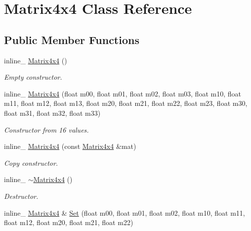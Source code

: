 \hypertarget{class_matrix4x4}{\section{Matrix4x4 Class Reference}
\label{class_matrix4x4}
}
\subsection*{Public Member Functions}
\begin{DoxyCompactItemize}
\item 
\hypertarget{class_matrix4x4_af12c3d04822f0fb2ee4e31f21117a889}{inline\+\_\+ \hyperlink{class_matrix4x4_af12c3d04822f0fb2ee4e31f21117a889}{Matrix4x4} ()}\label{class_matrix4x4_af12c3d04822f0fb2ee4e31f21117a889}

\begin{DoxyCompactList}\small\item\em Empty constructor. \end{DoxyCompactList}\item 
\hypertarget{class_matrix4x4_a99cc95e0b21467d1b25558aacfac7f1b}{inline\+\_\+ \hyperlink{class_matrix4x4_a99cc95e0b21467d1b25558aacfac7f1b}{Matrix4x4} (float m00, float m01, float m02, float m03, float m10, float m11, float m12, float m13, float m20, float m21, float m22, float m23, float m30, float m31, float m32, float m33)}\label{class_matrix4x4_a99cc95e0b21467d1b25558aacfac7f1b}

\begin{DoxyCompactList}\small\item\em Constructor from 16 values. \end{DoxyCompactList}\item 
\hypertarget{class_matrix4x4_a0d1bf6d849f305966d9cd641167372b1}{inline\+\_\+ \hyperlink{class_matrix4x4_a0d1bf6d849f305966d9cd641167372b1}{Matrix4x4} (const \hyperlink{class_matrix4x4}{Matrix4x4} \&mat)}\label{class_matrix4x4_a0d1bf6d849f305966d9cd641167372b1}

\begin{DoxyCompactList}\small\item\em Copy constructor. \end{DoxyCompactList}\item 
\hypertarget{class_matrix4x4_a6f86a878ccf07228c7ae1179c3ef246d}{inline\+\_\+ \hyperlink{class_matrix4x4_a6f86a878ccf07228c7ae1179c3ef246d}{$\sim$\+Matrix4x4} ()}\label{class_matrix4x4_a6f86a878ccf07228c7ae1179c3ef246d}

\begin{DoxyCompactList}\small\item\em Destructor. \end{DoxyCompactList}\item 
\hypertarget{class_matrix4x4_ad5090f474b46193e3a2f03f410d1800a}{inline\+\_\+ \hyperlink{class_matrix4x4}{Matrix4x4} \& \hyperlink{class_matrix4x4_ad5090f474b46193e3a2f03f410d1800a}{Set} (float m00, float m01, float m02, float m10, float m11, float m12, float m20, float m21, float m22)}\label{class_matrix4x4_ad5090f474b46193e3a2f03f410d1800a}


\end{DoxyCompactItemize}

